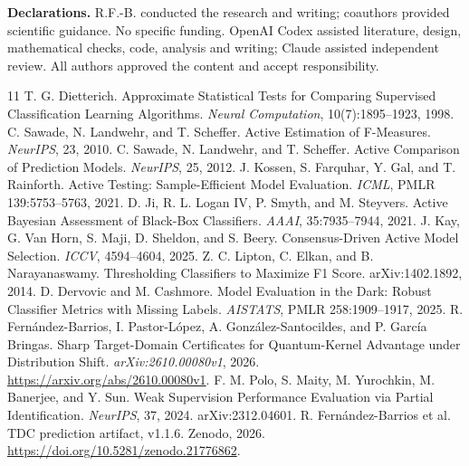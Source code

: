 \documentclass[a4paper]{esannV2}
\begin{document}
\smallskip\noindent\textbf{Declarations.}
R.F.-B. conducted the research and writing; coauthors provided scientific
guidance. No specific funding. OpenAI Codex assisted literature, design,
mathematical checks, code, analysis and writing; Claude assisted independent
review. All authors approved the content and accept responsibility.
\begin{footnotesize}
\begin{thebibliography}{11}
 T. G. Dietterich.
Approximate Statistical Tests for Comparing Supervised Classification Learning
Algorithms. \emph{Neural Computation}, 10(7):1895--1923, 1998.
 C. Sawade, N. Landwehr, and T. Scheffer.
Active Estimation of F-Measures. \emph{NeurIPS}, 23, 2010.
 C. Sawade, N. Landwehr, and T. Scheffer.
Active Comparison of Prediction Models. \emph{NeurIPS}, 25, 2012.
 J. Kossen, S. Farquhar, Y. Gal, and T. Rainforth.
Active Testing: Sample-Efficient Model Evaluation. \emph{ICML}, PMLR 139:5753--5763, 2021.
 D. Ji, R. L. Logan IV, P. Smyth, and M. Steyvers.
Active Bayesian Assessment of Black-Box Classifiers. \emph{AAAI}, 35:7935--7944, 2021.
 J. Kay, G. Van Horn, S. Maji, D. Sheldon, and S. Beery.
Consensus-Driven Active Model Selection. \emph{ICCV}, 4594--4604, 2025.
 Z. C. Lipton, C. Elkan, and B. Narayanaswamy.
Thresholding Classifiers to Maximize F1 Score. arXiv:1402.1892, 2014.
 D. Dervovic and M. Cashmore.
Model Evaluation in the Dark: Robust Classifier Metrics with Missing Labels.
\emph{AISTATS}, PMLR 258:1909--1917, 2025.
 R. Fern\'andez-Barrios, I. Pastor-L\'opez, A. Gonz\'alez-Santocildes,
and P. Garc\'ia Bringas. Sharp Target-Domain Certificates for Quantum-Kernel
Advantage under Distribution Shift. \emph{arXiv:2610.00080v1}, 2026.
\url{https://arxiv.org/abs/2610.00080v1}.
 F. M. Polo, S. Maity, M. Yurochkin, M. Banerjee, and Y. Sun.
Weak Supervision Performance Evaluation via Partial Identification.
\emph{NeurIPS}, 37, 2024. arXiv:2312.04601.
 R. Fern\'andez-Barrios et al.
TDC prediction artifact, v1.1.6. Zenodo, 2026.
\url{https://doi.org/10.5281/zenodo.21776862}.
\end{thebibliography}
\end{footnotesize}
\end{document}
